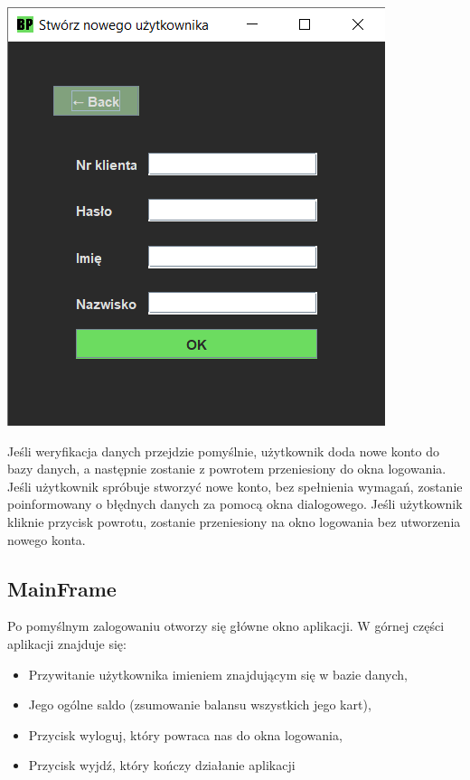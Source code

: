 \documentclass[12pt, letterpaper]{article}
\begin{document}
\begin{center}
	\includegraphics[scale=0.6]{newuser}
\end{center}

\quad Jeśli weryfikacja danych przejdzie pomyślnie, użytkownik doda nowe konto do bazy danych, a następnie zostanie z powrotem przeniesiony do okna logowania.
Jeśli użytkownik spróbuje stworzyć nowe konto, bez spełnienia wymagań, zostanie poinformowany o błędnych danych za pomocą okna dialogowego.
Jeśli użytkownik kliknie przycisk powrotu, zostanie przeniesiony na okno logowania bez utworzenia nowego konta.

\newpage

\subsection{MainFrame}

\quad Po pomyślnym zalogowaniu otworzy się główne okno aplikacji. 
W górnej części aplikacji znajduje się: 

\begin{itemize}
\item Przywitanie użytkownika imieniem znajdującym się w bazie danych,
\item Jego ogólne saldo (zsumowanie balansu wszystkich jego kart),
\item Przycisk wyloguj, który powraca nas do okna logowania,
\item Przycisk wyjdź, który kończy działanie aplikacji
\end{itemize}
\end{document}
